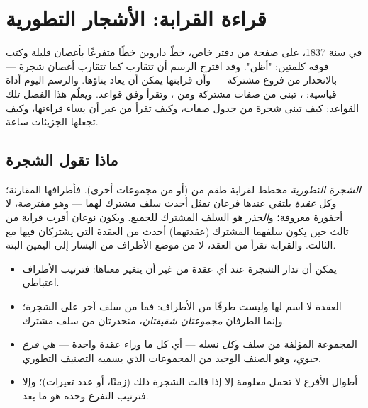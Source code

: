 \chapter{قراءة القرابة: الأشجار التطورية}\label{ch:g12:phylogenetic-trees}

في سنة 1837، على صفحة من دفتر خاص، خطّ داروين خطًا متفرعًا بأغصان قليلة
وكتب فوقه كلمتين: "أظن". وقد اقترح الرسم أن  تتقارب كما تتقارب
أغصان شجرة --- بالانحدار من فروع مشتركة --- وأن قرابتها يمكن أن يعاد
بناؤها. والرسم اليوم أداة قياسية: ، تبنى من صفات مشتركة ومن
، وتقرأ وفق قواعد. ويعلّم هذا الفصل تلك القواعد: كيف تبنى شجرة من
جدول صفات، وكيف تقرأ من غير أن يساء قراءتها، وكيف تجعلها الجزيئات
ساعة.

\section{ماذا تقول الشجرة}

\begin{definition}\label{def:g12:phylogenetic-trees:tree}
\emph{الشجرة التطورية} مخطط لقرابة طقم من 
(أو من مجموعات أخرى). فأطرافها  المقارنة؛ وكل \emph{عقدة}
يلتقي عندها فرعان تمثل أحدث سلف مشترك لهما --- وهو  مفترضة، لا
أحفورة معروفة؛ و\emph{الجذر} هو السلف المشترك للجميع. ويكون نوعان
أقرب قرابة من ثالث حين يكون سلفهما المشترك (عقدتهما) أحدث من العقدة
التي يشتركان فيها مع الثالث. والقرابة تقرأ من العقد، لا من موضع
الأطراف من اليسار إلى اليمين البتة.
\end{definition}

\begin{proposition}\label{prop:g12:phylogenetic-trees:rules}
\begin{itemize}
  \item يمكن أن تدار الشجرة عند أي عقدة من غير أن يتغير معناها: فترتيب
        الأطراف اعتباطي.
  \item العقدة لا اسم لها وليست طرفًا من الأطراف: فما من  سلف 
        آخر على الشجرة؛ وإنما الطرفان \emph{مجموعتان شقيقتان}، منحدرتان
        من سلف مشترك.
  \item المجموعة المؤلفة من سلف و\emph{كل} نسله --- أي كل ما وراء عقدة
        واحدة --- هي \emph{فرع حيوي}، وهو الصنف الوحيد
        من المجموعات الذي يسميه التصنيف التطوري.
  \item أطوال الأفرع لا تحمل معلومة إلا إذا قالت الشجرة ذلك (زمنًا، أو
        عدد تغيرات)؛ وإلا فترتيب التفرع وحده هو ما يعد.
\end{itemize}
\end{proposition}
\admitted

